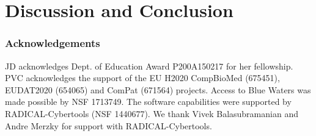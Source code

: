 \documentclass[conference]{IEEEtran}
\begin{document}
\section{Discussion and Conclusion}\label{sec:discussion}


\subsubsection*{Acknowledgements}
%

{\footnotesize JD acknowledges Dept. of Education Award P200A150217 for her
fellowship. PVC acknowledges the support of the EU H2020 CompBioMed (675451),
EUDAT2020 (654065) and ComPat (671564) projects. Access to Blue Waters was
made possible by NSF 1713749. The software capabilities were supported by
RADICAL-Cybertools (NSF 1440677). We thank Vivek Balasubramanian and Andre
Merzky for support with RADICAL-Cybertools.}
\newpage



\end{document}
